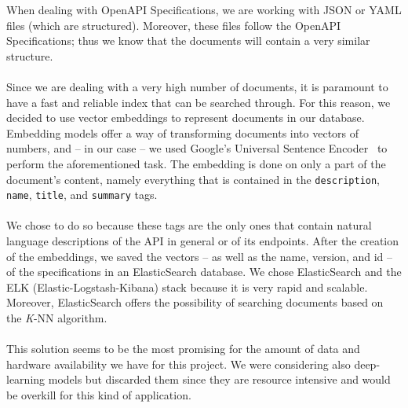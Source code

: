 When dealing with OpenAPI Specifications, we are working with JSON or YAML files (which are structured).
Moreover, these files follow the OpenAPI Specifications; thus we know that the documents will contain a very similar structure. \\ \\
Since we are dealing with a very high number of documents, it is paramount to have a fast and reliable index that can be searched through.
For this reason, we decided to use vector embeddings to represent documents in our database.
Embedding models offer a way of transforming documents into vectors of numbers, and -- in our case -- we used Google's Universal Sentence Encoder~\cite{cer_universal_2018} to perform the aforementioned task.
The embedding is done on only a part of the document's content, namely everything that is contained in the \verb|description|, \verb|name|, \verb|title|, and \verb|summary| tags. \\ \\
We chose to do so because these tags are the only ones that contain natural language descriptions of the API in general or of its endpoints.
After the creation of the embeddings, we saved the vectors -- as well as the name, version, and id -- of the specifications in an ElasticSearch database.
We chose ElasticSearch and the ELK (Elastic-Logstash-Kibana) stack because it is very rapid and scalable.
Moreover, ElasticSearch offers the possibility of searching documents based on the \textit{K}-NN algorithm. \\ \\
This solution seems to be the most promising for the amount of data and hardware availability we have for this project.
We were considering also deep-learning models but discarded them since they are resource intensive and would be overkill for this kind of application.